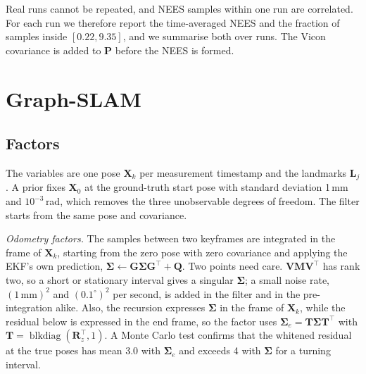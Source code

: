 \documentclass[conference]{IEEEtran}
\newcommand{\vect}[1]{\mathbf{#1}}
\newcommand{\T}{^{\top}}
\begin{document}
Real runs cannot be repeated, and NEES samples within one run are correlated. For each run we therefore report the time-averaged NEES and the fraction of samples inside $[0.22, 9.35]$, and we summarise both over runs. The Vicon covariance is added to $\vect{P}$ before the NEES is formed.

\section{Graph-SLAM}
\subsection{Factors}
The variables are one pose $\vect{X}_k$ per measurement timestamp and the landmarks $\vect{L}_j$. A prior fixes $\vect{X}_0$ at the ground-truth start pose with standard deviation 1\,mm and $10^{-3}$\,rad, which removes the three unobservable degrees of freedom. The filter starts from the same pose and covariance.

\emph{Odometry factors.} The samples between two keyframes are integrated in the frame of $\vect{X}_k$, starting from the zero pose with zero covariance and applying the EKF's own prediction, $\boldsymbol{\Sigma} \leftarrow \vect{G}\boldsymbol{\Sigma}\vect{G}\T + \vect{Q}$. Two points need care. $\vect{V}\vect{M}\vect{V}\T$ has rank two, so a short or stationary interval gives a singular $\boldsymbol{\Sigma}$; a small noise rate, $(1\,\mathrm{mm})^2$ and $(0.1^\circ)^2$ per second, is added in the filter and in the pre-integration alike. Also, the recursion expresses $\boldsymbol{\Sigma}$ in the frame of $\vect{X}_k$, while the residual below is expressed in the end frame, so the factor uses $\boldsymbol{\Sigma}_e = \vect{T}\boldsymbol{\Sigma}\vect{T}\T$ with $\vect{T} = \operatorname{blkdiag}(\vect{R}_z\T, 1)$. A Monte Carlo test confirms that the whitened residual at the true poses has mean 3.0 with $\boldsymbol{\Sigma}_e$ and exceeds 4 with $\boldsymbol{\Sigma}$ for a turning interval.
\end{document}
